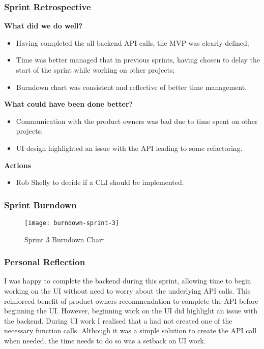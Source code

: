   \subsubsection{Sprint Retrospective}
  \textbf{What did we do well?}
  \begin{itemize}
   \item Having completed the all backend API calls, the MVP was clearly defined;
   \item Time was better managed that in previous sprints, having chosen to delay the start of the sprint while working on other projects;
   \item Burndown chart was consistent and reflective of better time management.
  \end{itemize}
   
   \noindent\textbf{What could have been done better?}
   \begin{itemize}
     \item Communication with the product owners was bad due to time spent on other projects;
     \item UI design highlighted an issue with the API leading to some refactoring.
   \end{itemize}
   
   \noindent\textbf{Actions}
   \begin{itemize}
     \item Rob Shelly to decide if a CLI should be implemented.
   \end{itemize}
   
   \subsubsection{Sprint Burndown}
   
   \begin{figure}[H]
     \setlength{\belowcaptionskip}{15pt plus 3pt minus 2pt}
     \caption{Sprint 3 Burndown Chart}
     \centering
     \texttt{[image: burndown-sprint-3]}
     \label{fig:burndown-sprint-2}
   \end{figure}
   
   \subsubsection{Personal Reflection}
   I was happy to complete the backend during this sprint, allowing time to begin working on the UI without need to worry about the underlying API calls. This reinforced benefit of product owners recommendation to complete the API before beginning the UI. However, beginning work on the UI did highlight an issue with the backend. During UI work I realised that a had not created one of the necessary function calls. Although it was a simple solution to create the API call when needed, the time needs to do so was a setback on UI work.
   
